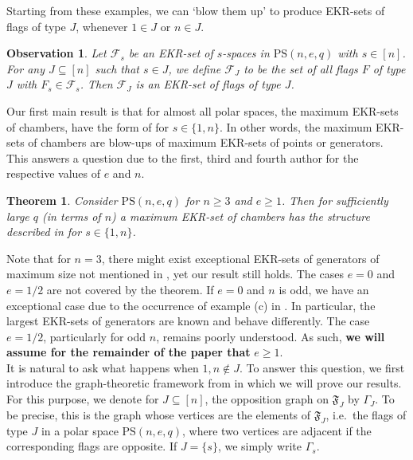 \documentclass[11pt]{article}
\newtheorem{obs}[thm]{Observation}
\newtheorem{theorem}[thm]{Theorem}
\newcommand{\EKR}{\mathcal{F}}
\newcommand{\PS}{\mathrm{PS}}
\newcommand{\cF}{\mathfrak{F}}
\renewcommand{\geq}{\geqslant}
\begin{document}
Starting from these examples, we can `blow them up' to produce EKR-sets of flags of type $J$, whenever $1 \in J$ or $n \in J$.

\begin{obs} \label{E: blow-ups of s-spaces}
    Let $\EKR_s$ be an EKR-set of $s$-spaces in $\PS(n,e,q)$ with $s \in [n]$. For any $J \subseteq [n]$ such that $s \in J$, we define $\EKR_J$ to be the set of all flags $F$ of type $J$ with $F_s\in \EKR_s$. Then $\EKR_J$ is an EKR-set of flags of type $J$.
\end{obs}

Our first main result is that for almost all polar spaces, the maximum EKR-sets of chambers, have the form of  for $s\in \{1,n\}$. In other words, the maximum EKR-sets of chambers are blow-ups of maximum EKR-sets of points or generators. This answers a question due to the first, third and fourth author \cite[Problem 3.19]{AlgebraicApproach2} for the respective values of $e$ and $n$. 

\begin{theorem}\label{thm:main}
    Consider $\PS(n,e,q)$ for $n \geq 3$ and $e\geq 1$. %
    Then for sufficiently large $q$ (in terms of $n$) a maximum EKR-set of chambers has the structure described in  for $s\in \{1,n\}$.
\end{theorem}

Note that for $n = 3$, there might exist exceptional EKR-sets of generators of maximum size not mentioned in \cite{EKR_polarspace_generators}, yet our result still holds. 
The cases $e=0$ and $e=1/2$ are not covered by the theorem. 
If $e = 0$ and $n$ is odd, we have an exceptional case due to the occurrence of example (c) in . In particular, the largest EKR-sets of generators are known and behave differently.
The case $e=1/2$, particularly for odd $n$, remains poorly understood.
As such, \textbf{we will assume for the remainder of the paper that} $e \geq 1$. \\ %

It is natural to ask what happens when $1,n \notin J$. To answer this question, we first introduce the graph-theoretic framework from \cite{AlgebraicApproach,AlgebraicApproach2} in which we will prove our results. For this purpose, we denote for $J \subseteq [n]$, the opposition graph on $\cF_J$ by $\Gamma_{J}$. To be precise, this is the graph whose vertices are the elements of $\cF_J$, i.e.\ the flags of type $J$ in a polar space $\PS(n,e,q)$, where two vertices are adjacent if the corresponding flags are opposite. If $J=\{s\}$, we simply write $\Gamma_s$. 
\end{document}
